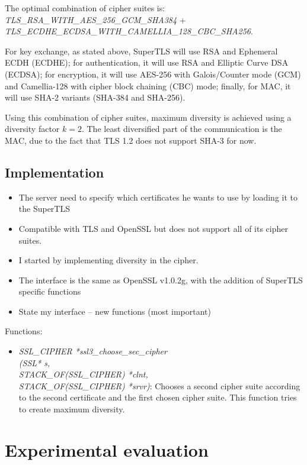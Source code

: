 \documentclass{sig-alternate-05-2015}
\begin{document}
The optimal combination of cipher suites is:\\
\textit{TLS\_RSA\_WITH\_AES\_256\_GCM\_SHA384} + \\\textit{TLS\_ECDHE\_ECDSA\_WITH\_CAMELLIA\_128\_CBC\_SHA256}.

For key exchange, as stated above, SuperTLS will use RSA and Ephemeral ECDH (ECDHE); for authentication, it will use RSA and Elliptic Curve DSA (ECDSA); for encryption, it will use AES-256 with Galois/Counter mode (GCM) and Camellia-128 with cipher block chaining (CBC) mode; finally, for MAC, it will use SHA-2 variants (SHA-384 and SHA-256).

Using this combination of cipher suites, maximum diversity is achieved using a diversity factor $k = 2$. The least diversified part of the communication is the MAC, due to the fact that TLS 1.2 does not support SHA-3 for now.

\subsection{Implementation}

\begin{itemize}
\item The server need to specify which certificates he wants to use by loading it to the SuperTLS
\item Compatible with TLS and OpenSSL but does not support all of its cipher suites.
\item I started by implementing diversity in the cipher.
\item The interface is the same as OpenSSL v1.0.2g, with the addition of SuperTLS specific functions
\item State my interface -- new functions (most important)
\end{itemize}

Functions:
\begin{itemize}
	\item{\textit{SSL\_CIPHER *ssl3\_choose\_sec\_cipher \\(SSL* s,\\ STACK\_OF(SSL\_CIPHER) *clnt,\\ STACK\_OF(SSL\_CIPHER) *srvr)}: Chooses a second cipher suite according to the second certificate and the first chosen cipher suite. This function tries to create maximum diversity.}
\end{itemize}

\section{Experimental evaluation}
\end{document}

